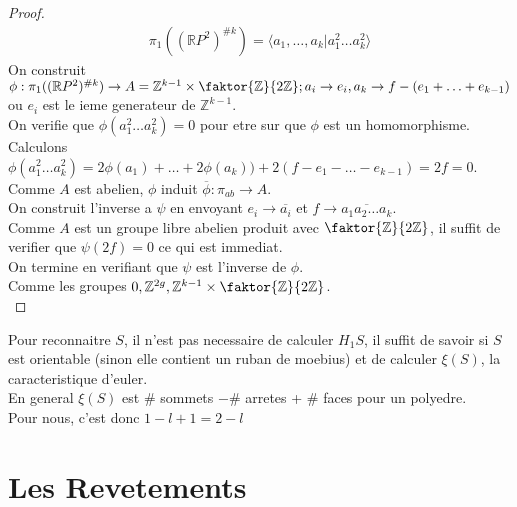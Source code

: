 \documentclass[../main.tex]{subfiles}
\begin{document}
\begin{proof}
\begin{align*}
\pi_1( ( \mathbb{R}P^{2})^{\# k}) =\langle a_1,\ldots, a_k | a_1^{2} \ldots a_k ^{2}\rangle
\end{align*}
On construit $\phi: \pi_1(  ( \mathbb{R}P^{2} )^{\# k}) \to A= \mathbb{Z}^{k-1}\times \faktor { \mathbb{Z}} { 2\mathbb{Z}}; a_i \to e_i, a_k \to f- ( e_1 +\ldots + e_{k-1} ) $ ou $e_i $ est le ieme generateur de $ \mathbb{Z}^{k-1}$.\\
On verifie que $\phi( a_1^{2} \ldots a_k^{2}) =0 $ pour etre sur que $\phi$ est un homomorphisme.\\
Calculons $\phi( a_1^{2} \ldots a_k ^{2}) = 2 \phi ( a_1) +\ldots +  2\phi( a_k) ) + 2 ( f- e_1 -\ldots - e_{k-1} ) = 2f =0 $.\\
Comme $A$ est abelien, $\phi$ induit $ \overline{\phi}: \pi_{ab} \to A$.\\
On construit l'inverse a $\psi$ en envoyant $e_i \to \overline{a_i}$ et $f\to \overline{a_1 a_2 \ldots a_k}$.\\
Comme $A$ est un groupe libre abelien produit avec $ \faktor { \mathbb{Z}} { 2 \mathbb{Z}} $, il suffit de verifier que $\psi( 2f) =0$ ce qui est immediat.\\
On termine en verifiant que $\psi$ est l'inverse de $\phi$.\\
Comme les groupes $0, \mathbb{Z}^{2g}, \mathbb{Z}^{k-1}\times \faktor { \mathbb{Z}} { 2 \mathbb{Z}} $.\\
\end{proof}
\begin{rmq}
Pour reconnaitre $S$, il n'est pas necessaire de calculer $H_1 S$, il suffit de savoir si $S$ est orientable (sinon elle contient un ruban de moebius) et de calculer $\xi( S) $, la caracteristique d'euler.\\
En general $\xi( S) $ est $\#$ sommets $- \#$ arretes + $\#$ faces pour un polyedre.\\
Pour nous, c'est donc $ 1-  l + 1= 2-l$ 
\end{rmq}
\section{Les Revetements}
\end{document}
